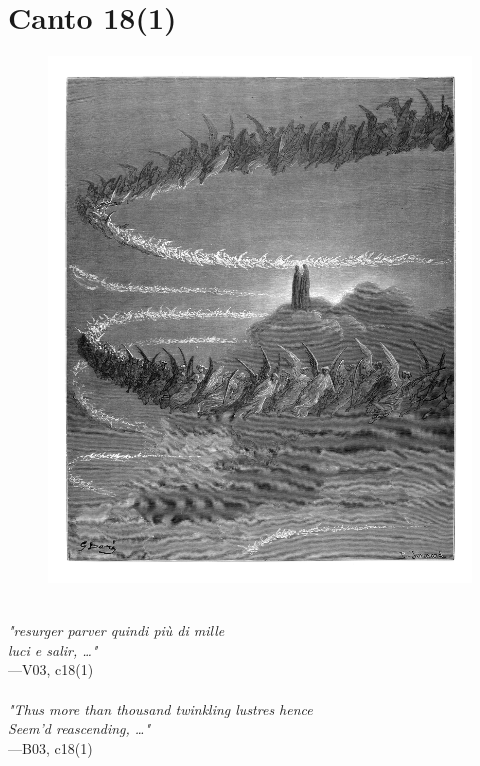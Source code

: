 \documentclass[../Dore_vision.tex]{subfiles}
\begin{document}
\newpage

\section{Canto 18(1)}

\begin{figure}[ht]
\centering
\includegraphics[height=\figsize]{illustrations/book_3/V03, c18(1).jpg}
\end{figure}

\begin{center}
\begin{minipage}{0.8\linewidth}
\textit{\\
"resurger parver quindi più di mille\\luci e salir, …"} \\
—V03, c18(1) \\~\\
\textit{"Thus more than thousand twinkling lustres hence\\Seem'd reascending, …"} \\
—B03, c18(1)
\end{minipage}
\end{center}
\end{document}

